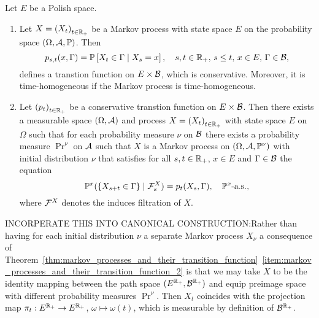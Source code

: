 \documentclass[../Master.tex]{subfiles}
\begin{document}
\begin{theorem}\label{thm:markov_processes_and_their_transition_function}
Let \(E\) be a Polish space.
\begin{enumerate}[label = (\roman*)]
  \item\label{item:markov_processes_and_their_transition_function_1} Let \(X = {(X_t)}_{t \in \mathbb{R}_+}\) be a Markov process with state space \(E\) on the probability space \((\Omega, \mathcal{A}, \mathbb{P} )\). Then
  \begin{equation}\label{eq:transiton_function_from_Markov_process}
    p_{s,t}(x, \Gamma) = \mathbb{P}\left[ X_t \in \Gamma \mid X_s = x  \right], \quad s,t \in \mathbb{R}_+, \, s \le t, \, x \in E, \, \Gamma \in \mathcal{B},
  \end{equation}
  defines a transtion function on \(E \times \mathcal{B}\), which is conservative. Moreover, it is time-homogeneous if the Markov process is time-homogeneous.
  \item\label{item:markov_processes_and_their_transition_function_2} Let \({(p_t)}_{t \in \mathbb{R}_+}\) be a conservative transtion function on \(E \times \mathcal{B}\). Then there exists a measurable space \((\Omega, \mathcal{A})\) and process \(X = {(X_t)}_{t \in \mathbb{R}_+}\) with state space \(E\) on \(\Omega{}\) such that for each probability measure \(\nu{}\) on \(\mathcal{B}\) there exists a probability measure \(\Pr^\nu{}\) on \(\mathcal{A}\) such that \(X\) is a Markov process on \((\Omega, \mathcal{A}, \mathbb{P}^\nu)\) with initial distribution \(\nu{}\) that satisfies for all \(s,t \in \mathbb{R}_+ \), \(x \in E \) and \(\Gamma \in \mathcal{B} \) the equation
  \begin{equation}\label{Markov_family_condition}
    \mathbb{P}^x(\{X_{s + t} \in \Gamma \} \mid \mathcal{F}^{X}_s) = p_t(X_s, \Gamma), \quad \mathbb{P}^x \text{-a.s.},
  \end{equation}
  where \(\mathcal{F}^{X}\) denotes the induces filtration of \(X\).
\end{enumerate}
\end{theorem}


INCORPERATE THIS INTO CANONICAL CONSTRUCTION:Rather than having for each initial distribution \(\nu{}\) a separate Markov process \(X_\nu{}\) a consequence of Theorem~\ref{thm:markov_processes_and_their_transition_function}~\ref{item:markov_processes_and_their_transition_function_2} is that we may take \(X\) to be the identity mapping between the path space \((E^{\mathbb{R}_+}, \mathcal{B}^{\mathbb{R}_+})\) and equip preimage space with different probability measures \(\Pr^\nu{}\). Then \(X_t\) coincides with the projection map \(\pi_t: E^{\mathbb{R}_+} \to E^{\mathbb{R}_+}\), \(\omega \mapsto \omega(t)\), which is measurable by definition of \(\mathcal{B}^{\mathbb{R}_+}\).
\end{document}

